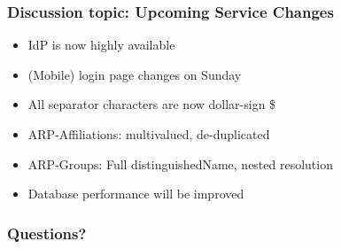 \documentclass[hyperref={colorlinks=true},professionalfonts]{beamer}
\begin{document}
\begin{frame}
\frametitle{Discussion topic: Upcoming Service Changes}
\begin{itemize}
\item IdP is now highly available 
\item (Mobile) login page changes on Sunday 
\item All separator characters are now dollar-sign \$ 
\item ARP-Affiliations: multivalued, de-duplicated 
\item ARP-Groups: Full distinguishedName, nested resolution
\item Database performance will be improved
\end{itemize}
\end{frame}

\begin{frame}
\frametitle{Questions?}
\end{frame}
\end{document}
